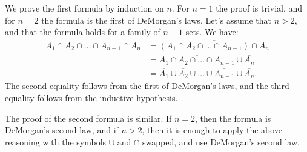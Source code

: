 \exercise
We prove the first formula by induction on $n$.
For $n=1$ the proof is trivial, and for $n=2$ the formula is the first of DeMorgan's laws.
Let's assume that $n>2$, and that the formula holds for a family of $n-1$ sets.
We have:
\begin{align*}
    \overline{A_1\cap A_2\cap\dots\cap A_{n-1}\cap A_n} &= \overline{(A_1\cap A_2\cap\dots\cap A_{n-1})\cap A_n} \\
    &= \overline{A_1\cap A_2\cap\dots\cap A_{n-1}}\cup\overline{A_n} \\
    &= \overline{A_1}\cup\overline{A_2}\cup\dots\cup\overline{A_{n-1}}\cup\overline{A_n}.
\end{align*}
The second equality follows from the first of DeMorgan's laws, and the third equality follows from the inductive hypothesis.

The proof of the second formula is similar.
If $n=2$, then the formula is DeMorgan's second law, and if $n>2$, then it is enough to apply the above reasoning with the symbols $\cup$ and $\cap$ swapped, and use DeMorgan's second law.
